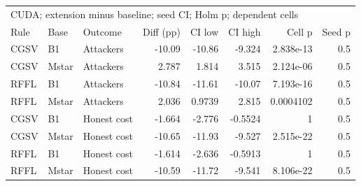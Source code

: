 \begin{tabular}{lllrrrrr}
\toprule
\multicolumn{8}{l}{CUDA; extension minus baseline; seed CI; Holm p; dependent cells} \\
Rule & Base & Outcome & Diff (pp) & CI low & CI high & Cell p & Seed p \\
\midrule
CGSV & B1 & Attackers & -10.09 & -10.86 & -9.324 & 2.838e-13 & 0.5 \\
CGSV & Mstar & Attackers & 2.787 & 1.814 & 3.515 & 2.124e-06 & 0.5 \\
RFFL & B1 & Attackers & -10.84 & -11.61 & -10.07 & 7.193e-16 & 0.5 \\
RFFL & Mstar & Attackers & 2.036 & 0.9739 & 2.815 & 0.0004102 & 0.5 \\
CGSV & B1 & Honest cost & -1.664 & -2.776 & -0.5524 & 1 & 0.5 \\
CGSV & Mstar & Honest cost & -10.65 & -11.93 & -9.527 & 2.515e-22 & 0.5 \\
RFFL & B1 & Honest cost & -1.614 & -2.636 & -0.5913 & 1 & 0.5 \\
RFFL & Mstar & Honest cost & -10.59 & -11.72 & -9.541 & 8.106e-22 & 0.5 \\
\bottomrule
\end{tabular}
